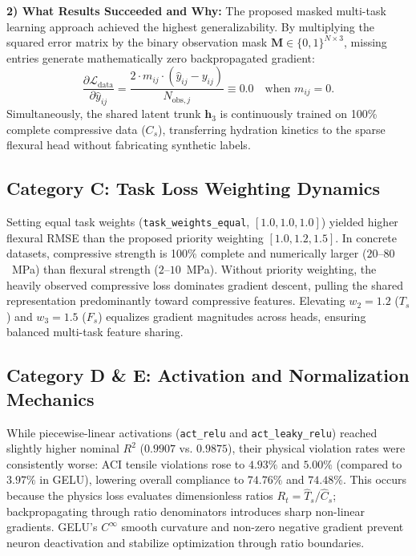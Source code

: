 \documentclass[conference]{IEEEtran}
\begin{document}
\textbf{2) What Results Succeeded and Why:}
The proposed masked multi-task learning approach achieved the highest generalizability. By multiplying the squared error matrix by the binary observation mask $\mathbf{M} \in \{0, 1\}^{N \times 3}$, missing entries generate mathematically zero backpropagated gradient:
\begin{equation}
    \frac{\partial \mathcal{L}_{\text{data}}}{\partial \hat{y}_{ij}} = \frac{2 \cdot m_{ij} \cdot (\hat{y}_{ij} - y_{ij})}{N_{\text{obs},j}} \equiv 0.0 \quad \text{when } m_{ij} = 0.
\end{equation}
Simultaneously, the shared latent trunk $\mathbf{h}_3$ is continuously trained on 100\% complete compressive data ($C_s$), transferring hydration kinetics to the sparse flexural head without fabricating synthetic labels.

\subsection{Category C: Task Loss Weighting Dynamics}
Setting equal task weights (\texttt{task\_weights\_equal}, $[1.0, 1.0, 1.0]$) yielded higher flexural RMSE than the proposed priority weighting $[1.0, 1.2, 1.5]$. In concrete datasets, compressive strength is 100\% complete and numerically larger ($20\text{--}80$~MPa) than flexural strength ($2\text{--}10$~MPa). Without priority weighting, the heavily observed compressive loss dominates gradient descent, pulling the shared representation predominantly toward compressive features. Elevating $w_2 = 1.2$ ($T_s$) and $w_3 = 1.5$ ($F_s$) equalizes gradient magnitudes across heads, ensuring balanced multi-task feature sharing.

\subsection{Category D \& E: Activation and Normalization Mechanics}
While piecewise-linear activations (\texttt{act\_relu} and \texttt{act\_leaky\_relu}) reached slightly higher nominal $R^2$ ($0.9907$ vs. $0.9875$), their physical violation rates were consistently worse: ACI tensile violations rose to $4.93\%$ and $5.00\%$ (compared to $3.97\%$ in GELU), lowering overall compliance to $74.76\%$ and $74.48\%$. This occurs because the physics loss evaluates dimensionless ratios $R_t = \hat{T}_s / \hat{C}_s$; backpropagating through ratio denominators introduces sharp non-linear gradients. GELU's $C^\infty$ smooth curvature and non-zero negative gradient prevent neuron deactivation and stabilize optimization through ratio boundaries.
\end{document}
